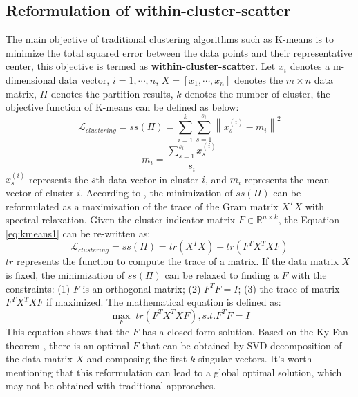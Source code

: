 \subsection{Reformulation of within-cluster-scatter}
\label{sec:reformulation}
The main objective of traditional clustering algorithms such as K-means is to minimize the total squared error between the data points and their representative center, this objective is termed as \textbf{within-cluster-scatter}. Let $x_i$ denotes a m-dimensional data vector, $i = 1,\cdots,n$, $X = [x_1, \cdots, x_n]$ denotes the $m \times n$ data matrix, $\Pi$ denotes the partition results, $k$ denotes the number of cluster, the objective function of K-means can be defined as below:
\begin{equation}
    \mathcal{L}_{clustering} = ss(\Pi) = \sum_{i=1}^k \sum_{s=1}^{s_i} \left\|x_s^{(i)} - m_i \right\|^2
    \label{eq:kmeans1}
\end{equation}
\begin{equation}
    m_i = \frac{\sum_{s=1}^{s_i} x_s^{(i)}}{s_i}
\end{equation}
$x_s^{(i)}$ represents the $s$th data vector in cluster $i$, and $m_i$ represents the mean vector of cluster $i$. According to \cite{zha2001spectral}, the minimization of $ss(\Pi)$ can be reformulated as a maximization of the trace of the Gram matrix $X^TX$ with spectral relaxation. Given the cluster indicator matrix $F \in \mathbb{R}^{n \times k}$, the Equation \ref{eq:kmeans1} can be re-written as:
\begin{equation}
    \mathcal{L}_{clustering} = ss(\Pi) = tr(X^TX) - tr(F^TX^TXF)
    \label{eq:kmeans2}
\end{equation}
$tr$ represents the function to compute the trace of a matrix. If the data matrix $X$ is fixed, the minimization of $ss(\Pi)$ can be relaxed to finding a $F$ with the constraints: (1) $F$ is an orthogonal matrix; (2) $F^TF = I$; (3) the trace of matrix $F^TX^TXF$ if maximized. The mathematical equation is defined as:
\begin{equation}
    \mathop{max} \limits_{F} \; tr(F^TX^TXF), s.t. F^TF = I
    \label{eq:kmeans3}
\end{equation}
This equation shows that the $F$ has a closed-form solution. Based on the Ky Fan theorem \cite{zha2001spectral}, there is an optimal $F$ that can be obtained by SVD decomposition of the data matrix $X$ and composing the first $k$ singular vectors. It's worth mentioning that this reformulation can lead to a global optimal solution, which may not be obtained with traditional approaches.

